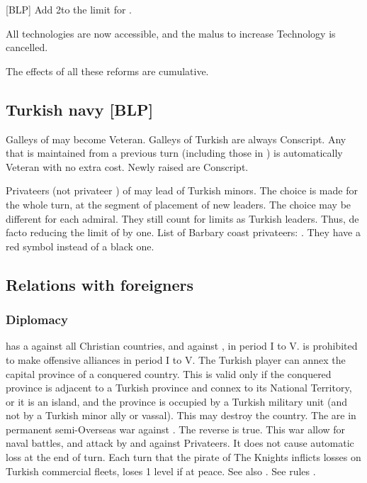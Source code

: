 [BLP] Add 2\LeaderG to the limit for \TUR.

All technologies are now accessible, and the malus to increase
Technology is cancelled.

\aparag The effects of all these reforms are cumulative.

\subsection{Turkish navy [BLP]}
\aparag Galleys of \TUR may become Veteran. Galleys of Turkish \VASSAL
are always Conscript.
\bparag Any \NGD that is maintained from a previous turn (including
those in \FLEET) is automatically Veteran with no extra cost.
\bparag Newly raised \NGD are Conscript.

 Privateers \LeaderA (not privateer
\LeaderE) of \TUR may lead \corsaire of Turkish minors.
\bparag The choice is made for the whole turn, at the segment of
placement of new leaders. The choice may be different for each
admiral.
\bparag They still count for limits as Turkish leaders. Thus, de facto
reducing the limit of \LeaderA by one.
\bparag List of Barbary coast privateers:
. They have a red symbol instead
of a black one.

\subsection{Relations with foreigners}
\subsubsection{Diplomacy}
\aparag \TUR has a \CB against all Christian countries, and against
, in period I to V.
\aparag \TUR is prohibited to make offensive alliances in period I to V.
The Turkish player can annex the capital province of a conquered
country. This is valid only if the conquered province is adjacent to a
Turkish province and connex to its National Territory, or it is an island,
and the province is occupied by a Turkish military
unit (and not by a Turkish minor ally or vassal). This may destroy the
country.
The  are in permanent semi-Overseas war against
\TUR. The reverse is true. This war allow for naval battles, and attack
by and against Privateers. It does not cause automatic \STAB loss at the
end of turn.
\bparag Each turn that the pirate of The Knights inflicts losses on
Turkish commercial fleets, \TUR loses 1 \STAB level if at peace.
\aparag See also .
See rules .


